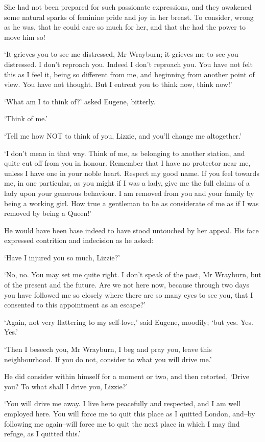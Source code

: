 She had not been prepared for such passionate expressions, and they
awakened some natural sparks of feminine pride and joy in her breast. To
consider, wrong as he was, that he could care so much for her, and that
she had the power to move him so!

‘It grieves you to see me distressed, Mr Wrayburn; it grieves me to see
you distressed. I don’t reproach you. Indeed I don’t reproach you.
You have not felt this as I feel it, being so different from me, and
beginning from another point of view. You have not thought. But I
entreat you to think now, think now!’

‘What am I to think of?’ asked Eugene, bitterly.

‘Think of me.’

‘Tell me how NOT to think of you, Lizzie, and you’ll change me
altogether.’

‘I don’t mean in that way. Think of me, as belonging to another station,
and quite cut off from you in honour. Remember that I have no protector
near me, unless I have one in your noble heart. Respect my good name.
If you feel towards me, in one particular, as you might if I was a lady,
give me the full claims of a lady upon your generous behaviour. I am
removed from you and your family by being a working girl. How true a
gentleman to be as considerate of me as if I was removed by being a
Queen!’

He would have been base indeed to have stood untouched by her appeal.
His face expressed contrition and indecision as he asked:

‘Have I injured you so much, Lizzie?’

‘No, no. You may set me quite right. I don’t speak of the past, Mr
Wrayburn, but of the present and the future. Are we not here now,
because through two days you have followed me so closely where there
are so many eyes to see you, that I consented to this appointment as an
escape?’

‘Again, not very flattering to my self-love,’ said Eugene, moodily; ‘but
yes. Yes. Yes.’

‘Then I beseech you, Mr Wrayburn, I beg and pray you, leave this
neighbourhood. If you do not, consider to what you will drive me.’

He did consider within himself for a moment or two, and then retorted,
‘Drive you? To what shall I drive you, Lizzie?’

‘You will drive me away. I live here peacefully and respected, and I am
well employed here. You will force me to quit this place as I quitted
London, and--by following me again--will force me to quit the next place
in which I may find refuge, as I quitted this.’

